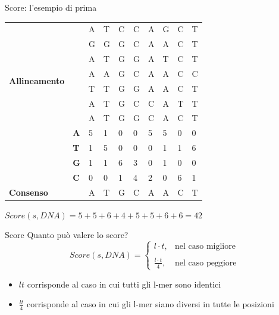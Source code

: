 	\begin{frame}{Score: l'esempio di prima}
		\begin{center}
			\begin{tabular}{l l l l l l l l l l}
				\multirow{8}{*}{\textbf{Allineamento}} & & A & T & C & C & A & G & C & T\\
				& & G & G & G & C & A & A & C & T\\
				& & A & T & G & G & A & T & C & T\\
				& & A & A & G & C & A & A & C & C\\
				& & T & T & G & G & A & A & C & T\\
				& & A & T & G & C & C & A & T & T\\
				& & A & T & G & G & C & A & C & T\\
				\hline
				\multirow{4}{*}{\textbf{Profilo}} & \textbf{A} & 5 & 1 & 0 & 0 & 5 & 5 & 0 & 0\\
				& \textbf{T} & 1 & 5 & 0 & 0 & 0 & 1 & 1 & 6\\
				& \textbf{G} & 1 & 1 & 6 & 3 & 0 & 1 & 0 & 0\\
				& \textbf{C} & 0 & 0 & 1 & 4 & 2 & 0 & 6 & 1\\
				\hline
				\textbf{Consenso} & & A & T & G & C & A & A & C & T 
			\end{tabular}
		\end{center}
		$Score(s,DNA) = 5+5+6+4+5+5+6+6=42$
	\end{frame}
	
	\begin{frame}{Score}
		Quanto può valere lo score?
		\begin{equation*}
			Score(s,DNA) = \begin{cases}
				l\cdot t, & \mbox{nel caso migliore}\\
				\\
				\frac{l\cdot t}{4}, & \mbox{nel caso peggiore}
			\end{cases}
		\end{equation*}
		\begin{flushleft}
		\end{flushleft}
		\begin{itemize}
			\item $lt$ corrisponde al caso in cui tutti gli l-mer sono identici
			\item $\frac{lt}{4}$ corrisponde al caso in cui gli l-mer siano diversi in tutte le posizioni
		\end{itemize}
	\end{frame}
	

